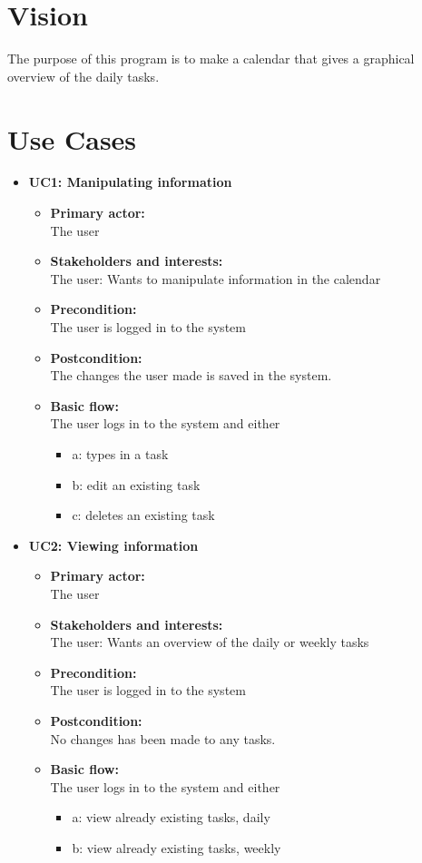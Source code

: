 \documentclass[a4paper, 10pt]{article}
\author{Andreas Precht Poulsen & Christian Rostrup Nielsen}
\begin{document}
\section{Vision}
The purpose of this program is to make a calendar that gives a graphical overview of the daily tasks.

\section{Use Cases}

\begin{itemize}
\item \textbf{UC1: Manipulating information}
	\begin{itemize}
	\item \textbf{Primary actor:}
		\\The user
	\item \textbf{Stakeholders and interests:}
		\\The user: Wants to manipulate information in the calendar
	\item \textbf{Precondition:}
		\\The user is logged in to the system
	\item \textbf{Postcondition:}
		\\The changes the user made is saved in the system.
	\item \textbf{Basic flow:}
		\\The user logs in to the system and either
		\begin{itemize}
			\item a: types in a task
			\item b: edit an existing task
			\item c: deletes an existing task
		\end{itemize}
	\end{itemize}

\item \textbf{UC2: Viewing information}
	\begin{itemize}
	\item \textbf{Primary actor:}
		\\The user
	\item \textbf{Stakeholders and interests:}
		\\The user: Wants an overview of the daily or weekly tasks
	\item \textbf{Precondition:}
		\\The user is logged in to the system
	\item \textbf{Postcondition:}
		\\No changes has been made to any tasks.
	\item \textbf{Basic flow:}
		\\The user logs in to the system and either
		\begin{itemize}
			\item a: view already existing tasks, daily
			\item b: view already existing tasks, weekly
		\end{itemize}
	\end{itemize}
\end{itemize}
\end{document}
